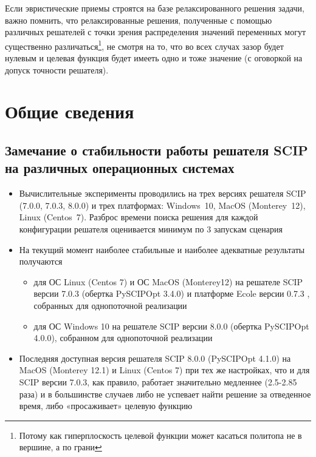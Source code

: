 \documentclass[%
	11pt,
	a4paper,
	utf8,
		]{article}
\begin{document}
Если эвристические приемы строятся на базе релаксированного решения задачи, важно помнить, что релаксированные решения, полученные с помощью различных решателей с точки зрения распределения значений переменных могут существенно различаться\footnote{Потому как гиперплоскость целевой функции может касаться политопа не в вершине, а по грани}, не смотря на то, что во всех случах зазор будет нулевым и целевая функция будет имееть одно и тоже значение (с оговоркой на допуск точности решателя). 


\section{Общие сведения}

\subsection{Замечание о стабильности работы решателя SCIP на различных операционных системах}

\begin{itemize}
	\item Вычислительные эксперименты проводились на трех версиях решателя SCIP (7.0.0, 7.0.3, 8.0.0) и трех платформах: Windows~10, MacOS (Monterey~12), Linux (Centos~7). Разброс времени поиска решения для каждой конфигурации решателя оценивается минимум по 3 запускам сценария
	
	\item На текущий момент наиболее стабильные и наиболее адекватные результаты получаются
	\begin{itemize}
		\item для ОС Linux (Centos 7) и ОС MacOS (Monterey12) на решателе SCIP версии 7.0.3 (обертка PySCIPOpt 3.4.0) и платформе Ecole версии 0.7.3 , собранных для однопоточной реализации
		
		\item для ОС Windows 10 на решателе SCIP версии 8.0.0 (обертка PySCIPOpt 4.0.0), собранном для однопоточной реализации
	\end{itemize}
	
	\item Последняя доступная версия решателя SCIP 8.0.0 (PySCIPOpt 4.1.0) на MacOS (Monterey 12.1) и Linux (Centos 7) при тех же настройках, что и для SCIP версии 7.0.3, как правило, работает значительно медленнее (2.5-2.85 раза) и в большинстве случаев либо не успевает найти решение за отведенное время, либо «просаживает» целевую функцию
\end{itemize}
\end{document}
